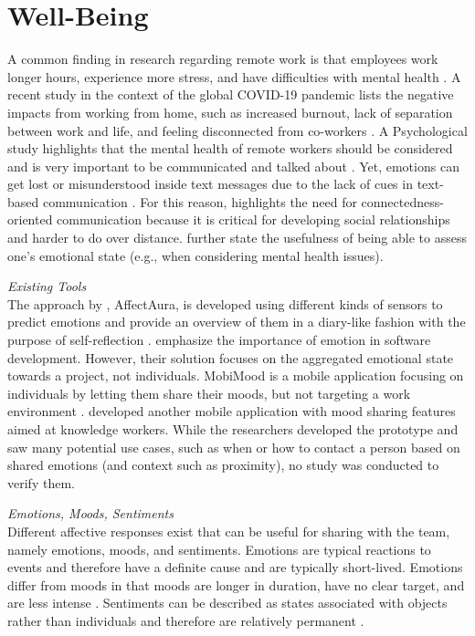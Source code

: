 \section{Well-Being}
\label{section:wellbeing}
A common finding in research regarding remote work is that employees work longer hours, experience more stress, and have difficulties with mental health \autocite{mswellbeing, mulki2009set, qualtricksmental}. A recent study in the context of the global COVID-19 pandemic lists the negative impacts from working from home, such as increased burnout, lack of separation between work and life, and feeling disconnected from co-workers \autocite{mswellbeing}. A Psychological study highlights that the mental health of remote workers should be considered and is very important to be communicated and talked about \autocite{grant2013exploration}. Yet, emotions can get lost or misunderstood inside text messages due to the lack of cues in text-based communication \autocite{hook2008interactional}. For this reason, \textcite{kuwabara2002connectedness} highlights the need for connectedness-oriented communication because it is critical for developing social relationships and harder to do over distance. \textcite{mcduff2012affectaura} further state the usefulness of being able to assess one’s emotional state (e.g., when considering mental health issues).

\medskip\noindent\textit{Existing Tools}\\
The approach by \citeauthor{mcduff2012affectaura}, AffectAura, is developed using different kinds of sensors to predict emotions and provide an overview of them in a diary-like fashion with the purpose of self-reflection \autocite{dullemond2013fixing}. \textcite{guzman2013towards} emphasize the importance of emotion in software development. However, their solution focuses on the aggregated emotional state towards a project, not individuals. MobiMood is a mobile application focusing on individuals by letting them share their moods, but not targeting a work environment \autocite{church2010study}. \textcite{saari2008mobile} developed another mobile application with mood sharing features aimed at knowledge workers. While the researchers developed the prototype and saw many potential use cases, such as when or how to contact a person based on shared emotions (and context such as proximity), no study was conducted to verify them.

\medskip\noindent\textit{Emotions, Moods, Sentiments}\\
Different affective responses exist that can be useful for sharing with the team, namely emotions, moods, and sentiments. Emotions are typical reactions to events and therefore have a definite cause and are typically short-lived. Emotions differ from moods in that moods are longer in duration, have no clear target, and are less intense \autocite{frijda1994varieties, brave2007emotion}. Sentiments can be described as states associated with objects rather than individuals and therefore are relatively permanent \autocite{brave2007emotion}.


